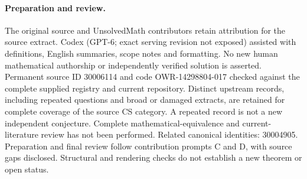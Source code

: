 \documentclass[11pt]{article}
\begin{document}
\paragraph{Preparation and review.}
The original source and UnsolvedMath contributors retain attribution for the source extract. Codex (GPT-6; exact serving revision not exposed) assisted with definitions, English summaries, scope notes and formatting. No new human mathematical authorship or independently verified solution is asserted. Permanent source ID 30006114 and code OWR-14298804-017 checked against the complete supplied registry and current repository. Distinct upstream records, including repeated questions and broad or damaged extracts, are retained for complete coverage of the source CS category. A repeated record is not a new independent conjecture. Complete mathematical-equivalence and current-literature review has not been performed. Related canonical identities: 30004905. Preparation and final review follow contribution prompts C and D, with source gaps disclosed. Structural and rendering checks do not establish a new theorem or open status.
\label{end:30006114}
\end{document}

